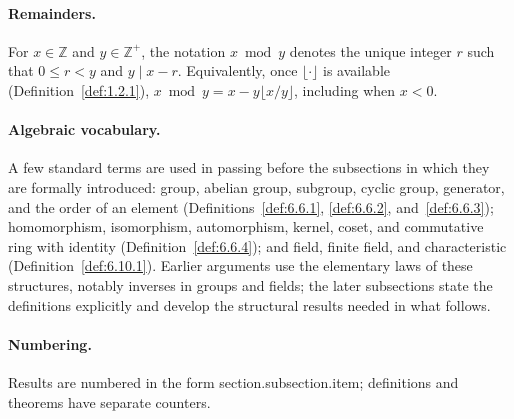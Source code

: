 \documentclass[11pt]{article}
\theoremstyle{ntstyle}
\begin{document}
\paragraph*{Remainders.}
For $x\in\mathbb{Z}$ and $y\in\mathbb{Z}^+$, the notation $x\bmod y$ denotes the unique integer $r$
such that $0\le r<y$ and $y\mid x-r$. Equivalently, once $\lfloor\cdot\rfloor$ is available
(Definition~\ref{def:1.2.1}), $x\bmod y=x-y\lfloor x/y\rfloor$, including when $x<0$.

\paragraph*{Algebraic vocabulary.}
A few standard terms are used in passing before the subsections in which they are formally
introduced: group, abelian group, subgroup, cyclic group, generator, and the order of an element
(Definitions~\ref{def:6.6.1}, \ref{def:6.6.2}, and~\ref{def:6.6.3});
homomorphism, isomorphism, automorphism, kernel, coset, and commutative ring with identity
(Definition~\ref{def:6.6.4}); and field, finite field, and characteristic
(Definition~\ref{def:6.10.1}).
Earlier arguments use the elementary laws of these structures, notably inverses in groups and
fields; the later subsections state the definitions explicitly and develop the structural results
needed in what follows.

\paragraph*{Numbering.}
Results are numbered in the form section.subsection.item; definitions and theorems have separate counters.
\end{document}
